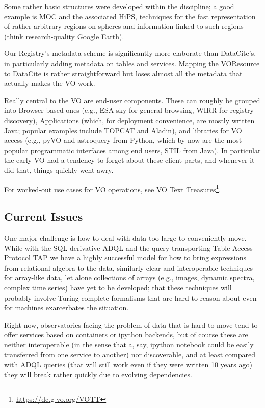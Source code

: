 Some rather basic structures were developed within the discipline; a
good example is MOC and the associated HiPS, techniques for the fast
representation of rather arbitrary regions on spheres and information
linked to such regions (think research-quality Google Earth).

Our Registry's metadata scheme is significantly more elaborate than
DataCite's, in particularly adding metadata on tables and services.
Mapping the VOResource to DataCite is rather straightforward but loses
almost all the metadata that actually makes the VO work.

Really central to the VO are end-user components.  These can roughly be
grouped into Browser-based ones (e.g., ESA sky for general browsing,
WIRR for registry discovery), Applications (which, for deployment
convenience, are mostly written Java; popular examples include TOPCAT
and Aladin), and libraries for VO access (e.g., pyVO and astroquery from
Python, which by now are the most popular programmatic interfaces among
end users, STIL from Java).  In particular the early VO had a tendency
to forget about these client parts, and whenever it did that, things
quickly went awry.

For worked-out use cases for VO operations, see VO Text
Treasures\footnote{\url{https://dc.g-vo.org/VOTT}}.

\subsection{Current Issues}

One major challenge is how to deal with data too large to conveniently
move.  While with the SQL derivative ADQL and the query-transporting
Table Access Protocol TAP we have a highly successful model for how to
bring expressions from relational algebra to the data, similarly clear and
interoperable techniques for array-like data, let alone collections of
arrays (e.g., images, dynamic spectra, complex time series) have yet to
be developed; that these techniques will probably involve
Turing-complete formalisms that are hard to reason about even for
machines exarcerbates the situation.  

Right now, observatories facing the problem of data that is hard to move
tend to offer services based on containers or ipython backends, but of
course these are neither interoperable (in the sense that a, say,
ipython notebook could be easily transferred from one service to
another) nor discoverable, and at least compared with ADQL queries (that
will still work even if they were written 10 years ago) they will break
rather quickly due to evolving dependencies.

